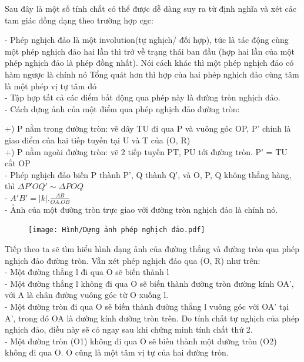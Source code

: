\begin{multicols}{2}
	Sau đây là một số tính chất có thể được dễ dàng suy ra từ định nghĩa và xét các tam giác đồng dạng theo trường hợp cgc:
	
	- Phép nghịch đảo là một involution(tự nghịch/ đối hợp), tức là tác động cùng một phép nghịch đảo hai lần thì trở về trạng thái ban đầu (hợp hai lần của một phép nghịch đảo là phép đồng nhất). Nói cách khác thì một phép nghịch đảo có hàm ngược là chính nó
	Tổng quát hơn thì hợp của hai phép nghịch đảo cùng tâm là một phép vị tự tâm đó \\
	- Tập hợp tất cả các điểm bất động qua phép này là đường tròn nghịch đảo. \\
	- Cách dựng ảnh của một điểm qua phép nghịch đảo đường tròn:
	
	+) P nằm trong đường tròn: vẽ dây TU đi qua P và vuông góc OP, P' chính là giao điểm của hai tiếp tuyến tại U và T của (O, R)\\
	+) P nằm ngoài đường tròn: vẽ 2 tiếp tuyến PT, PU tới đường tròn. P' = TU cắt OP \\
	- Phép nghịch đảo biến P thành P', Q thành Q', và O, P, Q không thẳng hàng, thì $\Delta  P'OQ' \sim  \Delta POQ$ \\
	- $A'B' = |k|. \frac{AB}{OA.OB}$ \\
	- Ảnh của một đường tròn trực giao với đường tròn nghịch đảo là chính nó.
	
	\begin{figure}[ht]
		\texttt{[image: Hình/Dựng ảnh phép nghịch đảo.pdf]}
	\end{figure}
	
	Tiếp theo ta sẽ tìm hiểu hình dạng ảnh của đường thẳng và đường tròn qua phép nghịch đảo đường tròn. Vẫn xét phép nghịch đảo qua (O, R) như trên: \\
	- Một đường thẳng l đi qua O sẽ biến thành l \\
	- Một đường thẳng l không đi qua O sẽ biến thành  đường tròn đường kính OA', với A là chân đường vuông góc từ O xuống l. \\ 
	- Một đường tròn đi qua O sẽ biến thành đường thẳng l vuông góc với OA' tại A', trong đó OA là đường kính đường tròn trên. Do tính chất tự nghịch của phép nghịch đảo, điều này sẽ có ngay sau khi chứng minh tính chất thứ 2. \\
	- Một đường tròn (O1) không đi qua O sẽ biến thành một đường tròn (O2) không đi qua O. O cũng là một tâm vị tự của hai đường tròn. 
	

\end{multicols}
